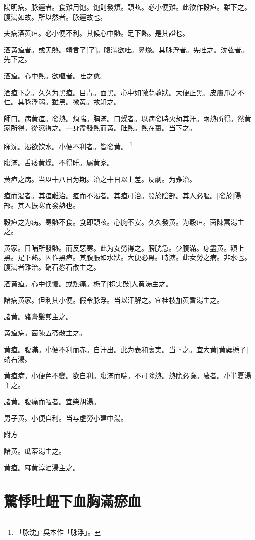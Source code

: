 \documentclass[oneside,b4paper]{ctexbook}
\begin{document}
\begin{flushleft}
陽明病。脉遲者。食難用饱。饱則發煩。頭眩。必小便難。此欲作穀疸。雖下之。腹滿如故。所以然者。脉遲故也。

夫病酒黄疸。必小便不利。其候心中熱。足下熱。是其證也。

酒黄疸者。或无熱。靖言了[了]。腹滿欲吐。鼻燥。其脉浮者。先吐之。沈弦者。先下之。

酒疸。心中熱。欲嘔者。吐之愈。

酒疸下之。久久为黑疸。目青。面黑。心中如噉蒜虀狀。大便正黑。皮膚爪之不仁。其脉浮弱。雖黑。微黄。故知之。

師曰。病黄疸。發熱。煩喘。胸滿。口燥者。以病發時火劫其汗。兩熱所得。然黄家所得。從濕得之。一身盡發熱而黄。肚熱。熱在裏。当下之。

脉沈。渴欲饮水。小便不利者。皆發黄。
\footnote{「脉沈」吳本作「脉浮」。}

腹滿。舌痿黄燥。不得睡。屬黄家。

黄疸之病。当以十八日为期。治之十日以上差。反劇。为難治。

疸而渴者。其疸難治。疸而不渴者。其疸可治。發於陰部。其人必嘔。[發於]陽部。其人振寒而發熱也。

穀疸之为病。寒熱不食。食即頭眩。心胸不安。久久發黄。为穀疸。茵陳蒿湯主之。

黄家。日晡所發熱。而反惡寒。此为女勞得之。膀胱急。少腹滿。身盡黄。額上黑。足下熱。因作黑疸。其腹脹如水狀。大便必黑。時溏。此女勞之病。非水也。腹滿者難治。硝石礬石散主之。

酒黄疸。心中懊憹。或熱痛。梔子[枳実豉]大黄湯主之。

諸病黄家。但利其小便。假令脉浮。当以汗解之。宜桂枝加黄耆湯主之。

諸黄。豬膏髮煎主之。

黄疸病。茵陳五苓散主之。

黄疸。腹滿。小便不利而赤。自汗出。此为表和裏実。当下之。宜大黄[黄蘗梔子]硝石湯。

黄疸病。小便色不變。欲自利。腹滿而喘。不可除熱。熱除必噦。噦者。小半夏湯主之。

諸黄。腹痛而嘔者。宜柴胡湯。

男子黄。小便自利。当与虛勞小建中湯。

附方

諸黄。瓜蒂湯主之。

黄疸。麻黄淳酒湯主之。

\chapter{驚悸吐衄下血胸滿瘀血}


\end{flushleft}
\end{document}
